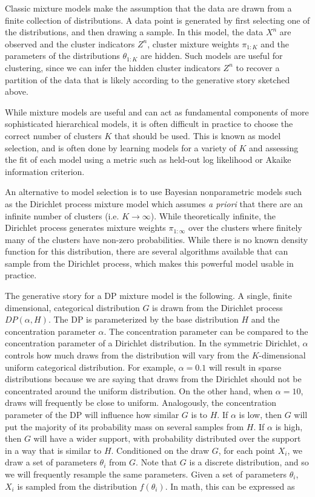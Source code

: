 Classic mixture models make the assumption that the data are drawn
from a finite collection of distributions. A data point is generated
by first selecting one of the distributions, and then drawing a
sample. In this model, the data $X^n$ are observed and the cluster
indicators $Z^n$, cluster mixture weights $\pi_{1:K}$ and the
parameters of the distributions $\theta_{1:K}$ are hidden. Such models
are useful for clustering, since we can infer the hidden cluster
indicators $Z^n$ to recover a partition of the data that is likely
according to the generative story sketched above.

While mixture models are useful and can act as fundamental components
of more sophisticated hierarchical models, it is often difficult in
practice to choose the correct number of clusters $K$ that should be
used. This is known as model selection, and is often done by learning
models for a variety of $K$ and assessing the fit of each model using
a metric such as held-out log likelihood or Akaike information
criterion.

An alternative to model selection is to use Bayesian nonparametric
models such as the Dirichlet process mixture model \cite{antoniak1974}
which assumes \textit{a priori} that there are an infinite number of
clusters (i.e. $K \to \infty$). While theoretically infinite, the
Dirichlet process generates mixture weights $\pi_{1:\infty}$ over the
clusters where finitely many of the clusters have non-zero
probabilities. While there is no known density function for this
distribution, there are several algorithms available that can sample
from the Dirichlet process, which makes this powerful model usable in
practice.

The generative story for a DP mixture model is the following. A
single, finite dimensional, categorical distribution $G$ is drawn from
the Dirichlet process $DP(\alpha, H)$. The DP is parameterized by the
base distribution $H$ and the concentration parameter $\alpha$. The
concentration parameter can be compared to the concentration parameter
of a Dirichlet distribution. In the symmetric Dirichlet, $\alpha$
controls how much draws from the distribution will vary from the
$K$-dimensional uniform categorical distribution. For example, $\alpha
= 0.1$ will result in sparse distributions because we are saying that
draws from the Dirichlet should not be concentrated around the uniform
distribution. On the other hand, when $\alpha = 10$, draws will
frequently be close to uniform. Analogously, the concentration
parameter of the DP will influence how similar $G$ is to $H$. If
$\alpha$ is low, then $G$ will put the majority of its probability
mass on several samples from $H$. If $\alpha$ is high, then $G$ will
have a wider support, with probability distributed over the support in
a way that is similar to $H$. Conditioned on the draw $G$, for each
point $X_i$, we draw a set of parameters $\theta_i$ from $G$. Note
that $G$ is a discrete distribution, and so we will frequently
resample the same parameters. Given a set of parameters $\theta_i$,
$X_i$ is sampled from the distribution $f(\theta_i)$. In math, this
can be expressed as


